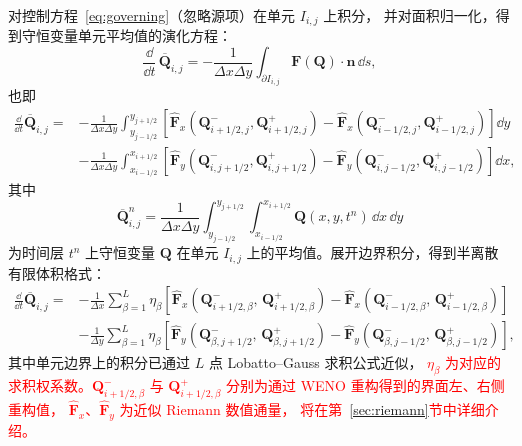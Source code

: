 \documentclass[12pt,a4paper]{article}
\numberwithin{equation}{section}    %
\begin{document}
对控制方程~\eqref{eq:governing}（忽略源项）在单元 $I_{i,j}$ 上积分，
并对面积归一化，得到守恒变量单元平均值的演化方程：
\begin{equation}
    \frac{\dd}{\dd t}\,\overline{\bm{Q}}_{i,j}
    = -\frac{1}{\Delta x \Delta y}
    \int_{\partial I_{i,j}} \bm{F}(\bm{Q}) \cdot \bm{n}\,\dd s,
\end{equation}
也即
\begin{equation}
    \label{eq:fv_boundary_integral}
    \begin{aligned}
        \frac{\dd}{\dd t}\overline{\bm{Q}}_{i,j}
        ={}&
        -\frac{1}{\Delta x\Delta y}
        \int_{y_{j-1/2}}^{y_{j+1/2}}
        \left[
        \hat{\bm{F}}_x\!\left(
        \bm{Q}_{i+1/2,j}^-,\bm{Q}_{i+1/2,j}^+
        \right)
        -
        \hat{\bm{F}}_x\!\left(
        \bm{Q}_{i-1/2,j}^-,\bm{Q}_{i-1/2,j}^+
        \right)
        \right]\dd y \\
        &-
        \frac{1}{\Delta x\Delta y}
        \int_{x_{i-1/2}}^{x_{i+1/2}}
        \left[
        \hat{\bm{F}}_y\!\left(
        \bm{Q}_{i,j+1/2}^-,\bm{Q}_{i,j+1/2}^+
        \right)
        -
        \hat{\bm{F}}_y\!\left(
        \bm{Q}_{i,j-1/2}^-,\bm{Q}_{i,j-1/2}^+
        \right)
        \right]\dd x,
    \end{aligned}
\end{equation}
其中
\begin{equation}
    \overline{\bm{Q}}_{i,j}^n
    = \frac{1}{\Delta x \Delta y}
    \int_{y_{j-1/2}}^{y_{j+1/2}} \int_{x_{i-1/2}}^{x_{i+1/2}}
    \bm{Q}(x, y, t^n)\,\dd x\,\dd y
\end{equation}
为时间层 $t^n$ 上守恒变量 $\bm{Q}$ 在单元 $I_{i,j}$ 上的平均值。展开边界积分，得到半离散有限体积格式：
\begin{equation}
    \label{eq:fv}
    \begin{aligned}
        \frac{\dd}{\dd t}\overline{\bm{Q}}_{i,j}
        = & -\frac{1}{\Delta x}
        \sum_{\beta=1}^{L} \eta_\beta
        \left[
            \hat{\bm{F}}_x\!\left(\bm{Q}_{i+1/2,\beta}^-,\, \bm{Q}_{i+1/2,\beta}^+\right)
            - \hat{\bm{F}}_x\!\left(\bm{Q}_{i-1/2,\beta}^-,\, \bm{Q}_{i-1/2,\beta}^+\right)
        \right] \\
          & -\frac{1}{\Delta y}
        \sum_{\beta=1}^{L} \eta_\beta
        \left[
            \hat{\bm{F}}_y\!\left(\bm{Q}_{\beta,j+1/2}^-,\, \bm{Q}_{\beta,j+1/2}^+\right)
            - \hat{\bm{F}}_y\!\left(\bm{Q}_{\beta,j-1/2}^-,\, \bm{Q}_{\beta,j-1/2}^+\right)
        \right],
    \end{aligned}
\end{equation}
其中单元边界上的积分已通过 $L$ 点 Lobatto--Gauss 求积公式近似，\textcolor{red}{
$\eta_\beta$ 为对应的求积权系数。$\bm{Q}_{i+1/2,\beta}^-$ 与
$\bm{Q}_{i+1/2,\beta}^+$ 分别为通过 WENO 重构得到的界面左、右侧重构值，
$\hat{\bm{F}}_x$、$\hat{\bm{F}}_y$ 为近似 Riemann 数值通量，
将在第~\autoref{sec:riemann}节中详细介绍。}
\end{document}
